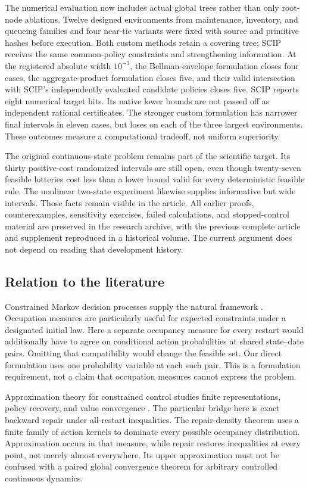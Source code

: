 The numerical evaluation now includes actual global trees rather than only root-node ablations. Twelve designed environments from maintenance, inventory, and queueing families and four near-tie variants were fixed with source and primitive hashes before execution. Both custom methods retain a covering tree; SCIP receives the same common-policy constraints and strengthening information. At the registered absolute width $10^{-3}$, the Bellman-envelope formulation closes four cases, the aggregate-product formulation closes five, and their valid intersection with SCIP's independently evaluated candidate policies closes five. SCIP reports eight numerical target hits. Its native lower bounds are not passed off as independent rational certificates. The stronger custom formulation has narrower final intervals in eleven cases, but loses on each of the three largest environments. These outcomes measure a computational tradeoff, not uniform superiority.

The original continuous-state problem remains part of the scientific target. Its thirty positive-cost randomized intervals are still open, even though twenty-seven feasible lotteries cost less than a lower bound valid for every deterministic feasible rule. The nonlinear two-state experiment likewise supplies informative but wide intervals. Those facts remain visible in the article. All earlier proofs, counterexamples, sensitivity exercises, failed calculations, and stopped-control material are preserved in the research archive, with the previous complete article and supplement reproduced in a historical volume. The current argument does not depend on reading that development history.

\subsection{Relation to the literature}
Constrained Markov decision processes supply the natural framework \citep{Altman1999}. Occupation measures are particularly useful for expected constraints under a designated initial law. Here a separate occupancy measure for every restart would additionally have to agree on conditional action probabilities at shared state--date pairs. Omitting that compatibility would change the feasible set. Our direct formulation uses one probability variable at each such pair. This is a formulation requirement, not a claim that occupation measures cannot express the problem.

Approximation theory for constrained control studies finite representations, policy recovery, and value convergence \citep{DufourPrietoRumeau2013,Saldi2018,SaldiLinderYuksel2018}. The particular bridge here is exact backward repair under all-restart inequalities. The repair-density theorem uses a finite family of action kernels to dominate every possible occupancy distribution. Approximation occurs in that measure, while repair restores inequalities at every point, not merely almost everywhere. Its upper approximation must not be confused with a paired global convergence theorem for arbitrary controlled continuous dynamics.

